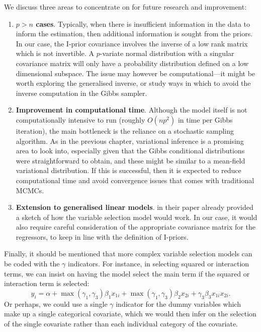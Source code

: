 \documentclass[a4paper,showframe,11pt]{report}
\begin{document}
We discuss three areas to concentrate on for future research and improvement:
\begin{enumerate}
  \item \textbf{\boldmath$p>n$ cases}. 
  Typically, when there is insufficient information in the data to inform the estimation, then additional information is sought from the priors. 
  In our case, the I-prior covariance involves the inverse of a low rank matrix which is not invertible.
  A $p$-variate normal distribution with a singular covariance matrix will only have a probability distribution defined on a low dimensional subspace.
  The issue may however be computational---it might be worth exploring the generalised inverse, or study ways in which to avoid the inverse computation in the Gibbs sampler.
  
  \item \textbf{Improvement in computational time}. 
  Although the model itself is not computationally intensive to run (roughly $O(np^2)$ in time per Gibbs iteration), the main bottleneck is the reliance on a stochastic sampling algorithm.
  As in the previous chapter, variational inference is a promising area to look into, especially given that the Gibbs conditional distributions were straightforward to obtain, and these might be similar to a mean-field variational distribution.
  If this is successful, then it is expected to reduce computational time and avoid convergence issues that comes with traditional MCMCs.
  
  \item \textbf{Extension to generalised linear models}.
  \citet{Kuo1998} in their paper already provided a sketch of how the variable selection model would work.
  In our case, it would also require careful consideration of the appropriate covariance matrix for the regressors, to keep in line with the definition of I-priors.
\end{enumerate}

Finally, it should be mentioned that more complex variable selection models can be coded with the $\gamma$ indicators.
For instance, in selecting squared or interaction terms, we can insist on having the model select the main term if the squared or interaction term is selected:
\[
  y_i = \alpha + \max(\gamma_1,\gamma_3) \beta_1x_{1i} + \max(\gamma_1,\gamma_3) \beta_2 x_{2i} + \gamma_3 \beta_3 x_{1i}x_{2i}.
\]
Or perhaps, we could use a single $\gamma$ indicator for the dummy variables which make up a single categorical covariate, which we would then infer on the selection of the single covariate rather than each individual category of the covariate.

%

\hClosingStuffStandalone
\end{document}
